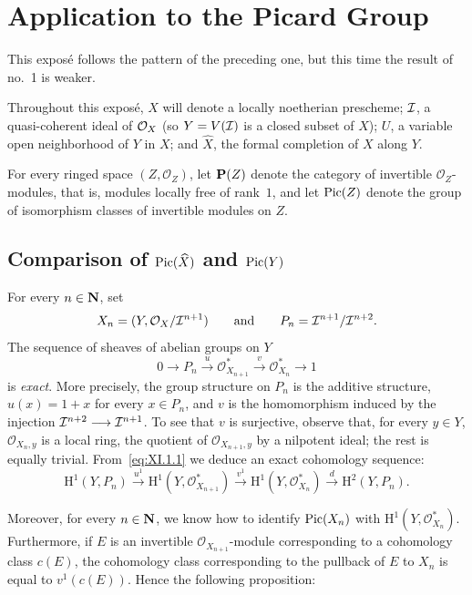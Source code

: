 \chapter{Application to the Picard Group}\label{XI}
\medskip
This expos\'e follows the pattern of the preceding one, but this time the result of no.~1 is weaker.

\medskip
Throughout this expos\'e, $X$ will denote a locally noetherian prescheme;
$\mathcal I$, a quasi-coherent ideal of $\mathcal O_X$ (so $Y=V(\mathcal I)$ is a closed subset of
$X$); $U$, a variable open neighborhood of $Y$ in $X$; and $\widehat X$,
the formal completion of $X$ along $Y$.

For every ringed space $(Z,\mathcal O_Z)$, let $\mathbf P(Z)$\label{pXI.1}
denote the category of invertible $\mathcal O_Z$-modules, that is, modules locally
free of rank~$1$, and let $\operatorname{Pic}(Z)$ denote the group of isomorphism classes of
invertible modules on $Z$.

\section{\texorpdfstring{Comparison of $\operatorname{Pic}(\widehat X)$ and $\operatorname{Pic}(Y)$}{Comparison of Pic(X-hat) and Pic(Y)}}\label{XI.1}

For every $n\in\mathbf N$, set
\[
X_n=(Y,\mathcal O_X/\mathcal I^{n+1})
\qquad\text{and}\qquad
P_n=\mathcal I^{n+1}/\mathcal I^{n+2}.
\]
The sequence of sheaves of abelian groups on $Y$
\begin{equation}\label{eq:XI.1.1}
0\longrightarrow P_n\xrightarrow{u}\mathcal O_{X_{n+1}}^*
\xrightarrow{v}\mathcal O_{X_n}^*\longrightarrow 1
\end{equation}
is \emph{exact}. More precisely, the group structure on $P_n$ is the additive
structure, $u(x)=1+x$ for every $x\in P_n$, and $v$ is the homomorphism induced
by the injection $\mathcal I^{n+2}\longrightarrow\mathcal I^{n+1}$. To see that $v$ is
surjective, observe that, for every $y\in Y$, $\mathcal O_{X_n,y}$ is a local
ring, the quotient of $\mathcal O_{X_{n+1},y}$ by a nilpotent ideal; the rest is
equally trivial. From~\eqref{eq:XI.1.1} we deduce an exact cohomology sequence:
\begin{equation*}\tag{$*$}\label{eq:XI.1.*}
\mathrm H^1(Y,P_n)\xrightarrow{u^1}\mathrm H^1(Y,\mathcal O_{X_{n+1}}^*)
\xrightarrow{v^1}\mathrm H^1(Y,\mathcal O_{X_n}^*)
\xrightarrow{d}\mathrm H^2(Y,P_n).
\end{equation*}

Moreover, for every $n\in\mathbf N$, we know how to identify
$\operatorname{Pic}(X_n)$ with $\mathrm H^1(Y,\mathcal O_{X_n}^*)$. Furthermore, if $E$
is an invertible $\mathcal O_{X_{n+1}}$-module corresponding to a cohomology
class $c(E)$\pageoriginale, the cohomology class corresponding to the pullback
of $E$ to $X_n$ is equal to $v^1(c(E))$. Hence the following proposition:

